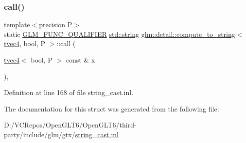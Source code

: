\subsubsection{\texorpdfstring{call()}{call()}}
{\footnotesize\ttfamily template$<$precision P$>$ \\
static \mbox{\hyperlink{setup_8hpp_a33fdea6f91c5f834105f7415e2a64407}{G\+L\+M\+\_\+\+F\+U\+N\+C\+\_\+\+Q\+U\+A\+L\+I\+F\+I\+ER}} \mbox{\hyperlink{glad_8h_ac83513893df92266f79a515488701770}{std\+::string}} \mbox{\hyperlink{structglm_1_1detail_1_1compute__to__string}{glm\+::detail\+::compute\+\_\+to\+\_\+string}}$<$ \mbox{\hyperlink{structglm_1_1tvec4}{tvec4}}, bool, P $>$\+::call (\begin{DoxyParamCaption}\item[{\mbox{\hyperlink{structglm_1_1tvec4}{tvec4}}$<$ bool, P $>$ const \&}]{x }\end{DoxyParamCaption})\hspace{0.3cm}{\ttfamily [inline]}, {\ttfamily [static]}}



Definition at line 168 of file string\+\_\+cast.\+inl.



The documentation for this struct was generated from the following file\+:\begin{DoxyCompactItemize}
\item 
D\+:/\+V\+C\+Repos/\+Open\+G\+L\+T6/\+Open\+G\+L\+T6/third-\/party/include/glm/gtx/\mbox{\hyperlink{string__cast_8inl}{string\+\_\+cast.\+inl}}\end{DoxyCompactItemize}
